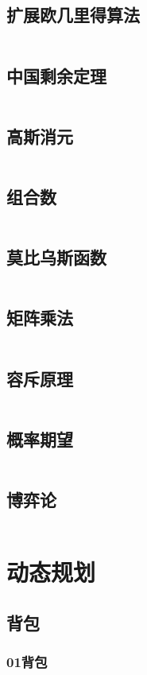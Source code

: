 \documentclass[a4paper,12pt]{article}
\begin{document}
\subsection{扩展欧几里得算法}
\inputminted[breaklines]{c++}{math/exgcd.cc}
\subsection{中国剩余定理}
\inputminted[breaklines]{c++}{math/crt.cc}
\subsection{高斯消元}
\inputminted[breaklines]{c++}{math/gauss.cc}
\subsection{组合数}
\inputminted[breaklines]{c++}{math/combine.cc}
\subsection{莫比乌斯函数}
\inputminted[breaklines]{c++}{math/mobius.cc}
\subsection{矩阵乘法}
\inputminted[breaklines]{c++}{math/matrix.cc}
\subsection{容斥原理}
\inputminted[breaklines]{c++}{math/rongchi.cc}
\subsection{概率期望}
\inputminted[breaklines]{c++}{math/qiwang.cc}
\subsection{博弈论}
\inputminted[breaklines]{c++}{math/game.cc}

\newpage
\section{动态规划}
\subsection{背包}
\subsubsection{01背包}
\end{document}

